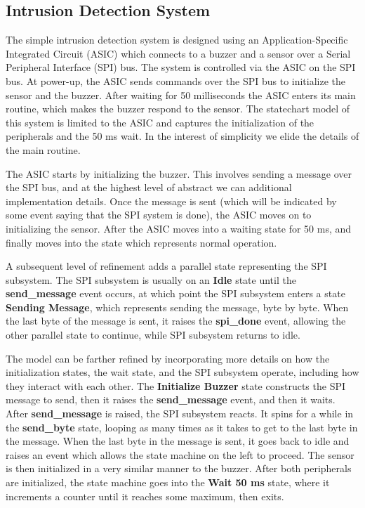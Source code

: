 

\subsection{Intrusion Detection System}
\label{sec:secbot}


The simple intrusion detection system is designed using an Application-Specific Integrated Circuit (ASIC) which connects to a buzzer and a sensor over a Serial Peripheral Interface (SPI) bus. The system is controlled via the ASIC on the SPI bus. At power-up, the ASIC sends commands over the SPI bus to initialize the sensor and the buzzer. After waiting for 50 milliseconds the ASIC enters its main routine, which makes the buzzer respond to the sensor. The statechart model of this system is limited to the ASIC and captures the initialization of the peripherals and the 50 ms wait. In the interest of simplicity we elide the details of the main routine.

The ASIC starts by initializing the buzzer. This involves sending a message over the SPI bus, and at the highest level of abstract we can additional implementation details. Once the message is sent (which will be indicated by some event saying that the SPI system is done), the ASIC moves on to initializing the sensor. After the ASIC moves into a waiting state for 50 ms, and finally moves into the state which represents normal operation.

A subsequent level of refinement adds a parallel state representing the SPI subsystem. The SPI subsystem is usually on an \textbf{Idle} state until the \textbf{send\_message} event occurs, at which point the SPI subsystem enters a state \textbf{Sending Message}, which represents sending the message, byte by byte. When the last byte of the message is sent, it raises the \textbf{spi\_done} event, allowing the other parallel state to continue, while SPI subsystem returns to idle.

The model can be farther refined by incorporating more details on how the initialization states, the wait state, and the SPI subsystem operate, including how they interact with each other. The \textbf{Initialize Buzzer} state constructs the SPI message to send, then it raises the \textbf{send\_message} event, and then it waits.
After \textbf{send\_message} is raised, the SPI subsystem reacts. It spins for a while in the \textbf{send\_byte} state, looping as many times as it takes to get to the last byte in the message. When the last byte in the message is sent, it goes back to idle and raises an event which allows the state machine on the left to proceed. The sensor is then initialized in a very similar manner to the buzzer. After both peripherals are initialized, the state machine goes into the \textbf{Wait 50 ms} state, where it  increments a counter until it reaches some maximum, then exits.



